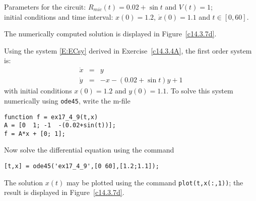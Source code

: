 \documentclass{ximera}
\begin{document}
\begin{computerExercise} \label{c14.3.7d}
Parameters for the circuit: $R_{mic}(t) = 0.02+\sin t$ and $V(t) = 1$;\\
initial conditions and time interval: $x(0) = 1.2$, $\dot{x}(0) = 1.1$ and 
$t\in[0,60]$.

\begin{solution}
\ans The numerically computed solution is displayed in 
Figure~\ref{c14.3.7d}.

\soln  Using the system \eqref{E:ECsy} derived in 
Exercise~\ref{c14.3.4A}, the first order system is:
\begin{eqnarray*}
\dot{x} & = & y \\
\dot{y} & = & -x - (0.02+\sin t)y + 1
\end{eqnarray*}
with initial conditions $x(0)=1.2$ and $y(0)=1.1$.   To solve this system numerically 
using {\tt ode45}, write the m-file
\begin{verbatim}
function f = ex17_4_9(t,x)
A = [0  1; -1  -(0.02+sin(t))];
f = A*x + [0; 1];
\end{verbatim}
Now solve the differential equation using the command
\begin{verbatim}
[t,x] = ode45('ex17_4_9',[0 60],[1.2;1.1]);
\end{verbatim}
The solution $x(t)$ may be plotted using the command {\tt plot(t,x(:,1))}; the 
result is displayed in Figure~\ref{c14.3.7d}.
\begin{figure}[htb]
     \centerline{%
     }
\end{figure} 





\end{solution}
\end{computerExercise}
\end{document}
